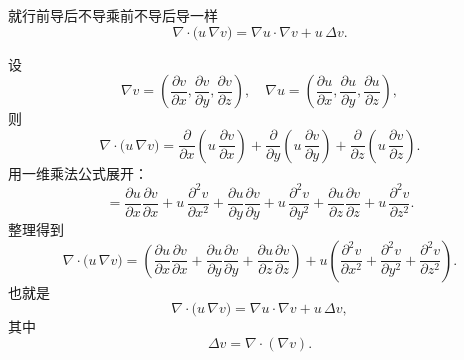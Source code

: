 \begin{note}
就行前导后不导乘前不导后导一样
\[
\nabla\cdot\bigl(u\,\nabla v\bigr)
= \nabla u\cdot\nabla v + u\,\Delta v.
\]

设
\[
\nabla v = \left(\frac{\partial v}{\partial x},
               \frac{\partial v}{\partial y},
               \frac{\partial v}{\partial z}\right),
\quad
\nabla u = \left(\frac{\partial u}{\partial x},
               \frac{\partial u}{\partial y},
               \frac{\partial u}{\partial z}\right),
\]
则
\[
\nabla\cdot\bigl(u\,\nabla v\bigr)
= \frac{\partial}{\partial x}\!\left(u\,\frac{\partial v}{\partial x}\right)
 +  \frac{\partial}{\partial y}\!\left(u\,\frac{\partial v}{\partial y}\right)
 +  \frac{\partial}{\partial z}\!\left(u\,\frac{\partial v}{\partial z}\right).
\]
用一维乘法公式展开：
\[
= \frac{\partial u}{\partial x}\frac{\partial v}{\partial x}
  +u\,\frac{\partial^2 v}{\partial x^2}
 +\frac{\partial u}{\partial y}\frac{\partial v}{\partial y}
  +u\,\frac{\partial^2 v}{\partial y^2}
 +\frac{\partial u}{\partial z}\frac{\partial v}{\partial z}
  +u\,\frac{\partial^2 v}{\partial z^2}.
\]
整理得到
\[
\nabla\cdot\bigl(u\,\nabla v\bigr)
= \left(
    \frac{\partial u}{\partial x}\frac{\partial v}{\partial x}
   +\frac{\partial u}{\partial y}\frac{\partial v}{\partial y}
   +\frac{\partial u}{\partial z}\frac{\partial v}{\partial z}
  \right)
 + u\left(
    \frac{\partial^2 v}{\partial x^2}
   +\frac{\partial^2 v}{\partial y^2}
   +\frac{\partial^2 v}{\partial z^2}
   \right).
\]
也就是
\[
\nabla\cdot\bigl(u\,\nabla v\bigr)
= \nabla u\cdot\nabla v + u\,\Delta v,
\]
其中
\[
\Delta v = \nabla\cdot(\nabla v).
\]   
\end{note}
